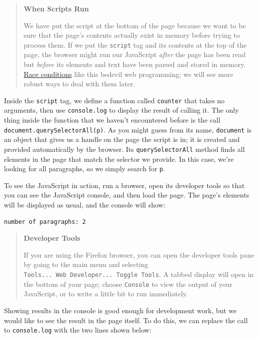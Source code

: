 \begin{quote}
\textbf{When Scripts Run}

We have put the script at the bottom of the page because we want to be
sure that the page's contents actually exist in memory before trying to
process them. If we put the \texttt{script} tag and its contents at the
top of the page, the browser might run our JavaScript \emph{after} the
page has been read but \emph{before} its elements and text have been
parsed and stored in memory. \protect\hyperlink{g:race-condition}{Race
conditions} like this bedevil web programming; we will see more robust
ways to deal with them later.
\end{quote}

Inside the \texttt{script} tag, we define a function called
\texttt{counter} that takes no arguments, then use \texttt{console.log}
to display the result of calling it. The only thing inside the function
that we haven't encountered before is the call
\texttt{document.querySelectorAll(\textquotesingle{}p\textquotesingle{})}.
As you might guess from its name, \texttt{document} is an object that
gives us a handle on the page the script is in; it is created and
provided automatically by the browser. Its \texttt{querySelectorAll}
method finds all elements in the page that match the selector we
provide. In this case, we're looking for all paragraphs, so we simply
search for \texttt{\textquotesingle{}p\textquotesingle{}}.

To see the JavaScript in action, run a browser, open its developer tools
so that you can see the JavaScript console, and then load the page. The
page's elements will be displayed as usual, and the console will show:

\begin{verbatim}
number of paragraphs: 2
\end{verbatim}

\begin{quote}
\textbf{Developer Tools}

If you are using the Firefox browser, you can open the developer tools
pane by going to the main menu and selecting
\texttt{Tools...\ Web\ Developer...\ Toggle\ Tools}. A tabbed display
will open in the bottom of your page; choose \texttt{Console} to view
the output of your JavaScript, or to write a little bit to run
immediately.
\end{quote}

Showing results in the console is good enough for development work, but
we would like to see the result in the page itself. To do this, we can
replace the call to \texttt{console.log} with the two lines shown below:

